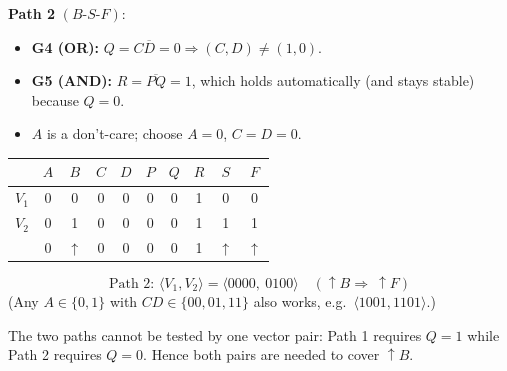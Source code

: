 \documentclass[a4paper, 10pt]{article}
\begin{document}
\begin{solution}
	\noindent\textbf{Path 2} \( (B\text{-}S\text{-}F) \):
	\begin{itemize}
		\item \textbf{G4 (OR):} \( Q = C\overline{D} = 0 \Rightarrow (C, D) \neq (1, 0) \).
		\item \textbf{G5 (AND):} \( R = \overline{PQ} = 1 \), which holds automatically (and stays stable) because \( Q = 0 \).
		\item \( A \) is a don't-care; choose \( A = 0 \), \( C = D = 0 \).
	\end{itemize}
	\begin{center}
		\begin{tabular}{c|cccc|cccc|c}
			\toprule
			          & \( A \) & \( B \)        & \( C \) & \( D \) & \( P \) & \( Q \) & \( R \) & \( S \)        & \( F \)        \\
			\midrule
			\( V_1 \) & 0       & 0              & 0       & 0       & 0       & 0       & 1       & 0              & 0              \\
			\( V_2 \) & 0       & 1              & 0       & 0       & 0       & 0       & 1       & 1              & 1              \\
			\midrule
			          & 0       & \( \uparrow \) & 0       & 0       & 0       & 0       & 1       & \( \uparrow \) & \( \uparrow \) \\
			\bottomrule
		\end{tabular}
	\end{center}
	\[ \boxed{\text{Path 2: } \langle V_1, V_2 \rangle = \langle 0000,\ 0100 \rangle} \quad (\uparrow B \Rightarrow\ \uparrow F) \]
	(Any \( A \in \{0,1\} \) with \( CD \in \{00, 01, 11\} \) also works, e.g.\ \( \langle 1001, 1101 \rangle \).)

	\medskip
	\noindent The two paths cannot be tested by one vector pair: Path 1 requires \( Q = 1 \)
	while Path 2 requires \( Q = 0 \). Hence both pairs are needed to cover \( \uparrow B \).
\end{solution}
\end{document}
